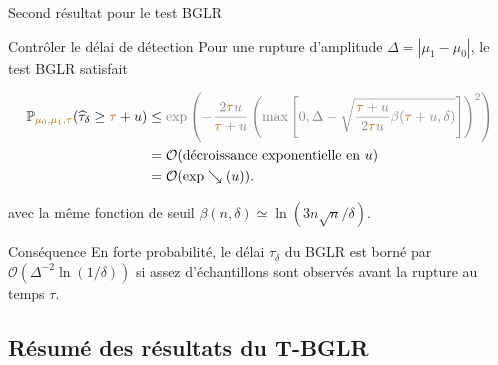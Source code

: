 \documentclass[11pt,french,ignorenonframetext,]{beamer}
\begin{document}
\begin{frame}{Second résultat pour le test BGLR \dSmiley{}}

  \begin{block}{Contrôler le délai de détection}
      Pour une rupture d'amplitude $\Delta = |\mu_1 - \mu_0|$,
      le test BGLR satisfait
      \begin{small}
        \begin{align*}
            \mathbb{P}_{\textcolor{gold}{\mu_0,\mu_1,\tau}} (\widehat{\tau}_{\delta} \geq \textcolor{gold}{\tau} + u) &\leq \textcolor{gray}{\exp\left( -\frac{2\textcolor{gold}{\tau} u}{\textcolor{gold}{\tau} + u}\left(\max\left[ 0, \Delta - \sqrt{\frac{\textcolor{gold}{\tau} + u}{2\textcolor{gold}{\tau} u} \beta(\textcolor{gold}{\tau} + u,\delta)} \right]\right)^2 \right)} \\
            &= \mathcal{O}(\text{décroissance exponentielle en~} u) \\
            &= \mathcal{O}(\exp\searrow(u)).
        \end{align*}
      \end{small}
      avec la même fonction de seuil
      $\beta(n,\delta) \simeq \ln(3n \sqrt{n}/\delta)$.
  \end{block}

  \begin{exampleblock}{Conséquence}
    En forte probabilité, \alert{le délai $\widehat{\tau}_\delta$ du BGLR est borné} par $\mathcal{O}(\Delta^{-2} \ln(1/\delta))$ \alert{si assez d'échantillons sont observés avant la rupture} au temps $\tau$.
  \end{exampleblock}

\end{frame}


\subsection{\hfill{}Résumé des résultats du T-BGLR\hfill{}}
\end{document}

